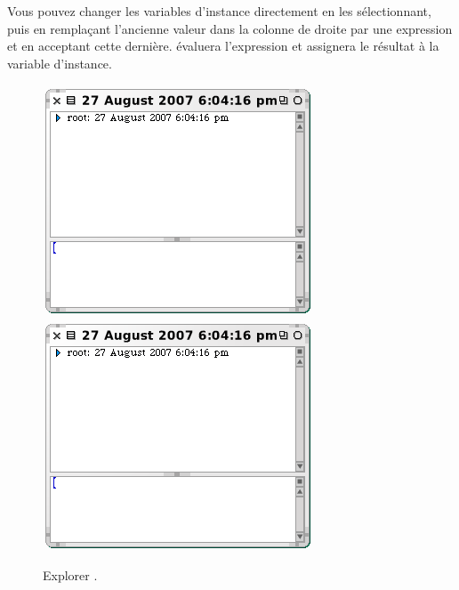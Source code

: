 \documentclass[a4paper,10pt,twoside]{book}
\begin{document}
Vous pouvez changer les variables d'instance directement en les s\'electionnant,
puis en rempla\c{c}ant l'ancienne valeur dans la colonne de droite
par une expression \sq et en acceptant cette derni\`ere.
\sq \'evaluera l'expression et assignera le r\'esultat \`a la variable
d'instance.

\begin{figure}[tbp]
\begin{minipage}{0.48\textwidth}
	\begin{center}
	\ifluluelse
		{\includegraphics[width=\textwidth]{exploreTimeStampNow}}
		{\includegraphics[scale=0.7]{exploreTimeStampNow}}
	\end{center}
	\caption{Explorer .}
	\label{fig:exploreTimeStampNow}
\end{minipage}
\hfill
\begin{minipage}{0.48\textwidth}

\end{minipage}
\end{figure}
\end{document}

